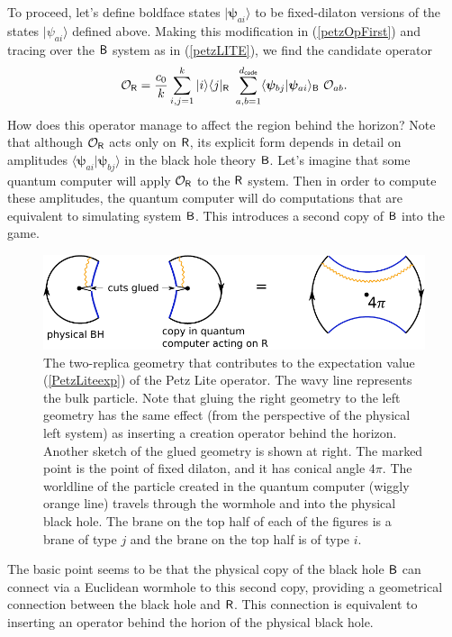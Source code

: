 \documentclass[11pt]{article}
\newcommand{\be}{\begin{equation}}
\newcommand{\ee}{\end{equation}}
\numberwithin{equation}{section}
\begin{document}
To proceed, let's define boldface states $|\bm{\psi}_{ai}\rangle$ to be fixed-dilaton versions of the states $|\psi_{ai}\rangle$ defined above. Making this modification in (\ref{petzOpFirst}) and tracing over the $\sf{B}$ system as in (\ref{petzLITE}), we find the candidate operator
\be
\mathcal{O}_{\sf{R}} = \frac{c_0}{k}\sum_{i,j = 1}^k|i\rangle\langle j|_{\sf{R}} \ \sum_{a,b = 1}^{d_{\sf{code}}}\langle\bm{\psi}_{bj}|\bm{\psi}_{ai}\rangle_{\sf{B}} \ \mathcal{O}_{ab}.
\ee
How does this operator manage to affect the region behind the horizon? Note that although $\mathcal{O}_{\sf{R}}$ acts only on $\sf{R}$, its explicit form depends in detail on amplitudes $\langle \bm{\psi}_{ai}|\bm{\psi}_{bj}\rangle$ in the black hole theory $\sf{B}$. Let's imagine that some quantum computer will apply $\mathcal{O}_{\sf{R}}$ to the $\sf{R}$ system. Then in order to compute these amplitudes, the quantum computer will do computations that are equivalent to simulating system $\sf{B}$. This introduces a second copy of $\sf{B}$ into the game.
\begin{figure}[t]
\begin{center}
\includegraphics[width = .7\textwidth]{images/petzLite.pdf}
\caption{{\small The two-replica geometry that contributes to the expectation value (\ref{PetzLiteexp}) of the Petz Lite operator. The wavy line represents the bulk particle. Note that gluing the right geometry to the left geometry has the same effect (from the perspective of the physical left system) as inserting a creation operator behind the horizon. Another sketch of the glued geometry is shown at right. The marked point is the point of fixed dilaton, and it has conical angle $4\pi$. The worldline of the particle created in the quantum computer (wiggly orange line) travels through the wormhole and into the physical black hole. The brane on the top half of each of the figures is a brane of type $j$ and the brane on the top half is of type $i$.}}\label{fig:petzLite}
\end{center}
\end{figure}

The basic point seems to be that the physical copy of the black hole $\sf{B}$ can connect via a Euclidean wormhole to this second copy, providing a geometrical connection between the black hole and $\sf{R}$. This connection is equivalent to inserting an operator behind the horion of the physical black hole.
\end{document}
